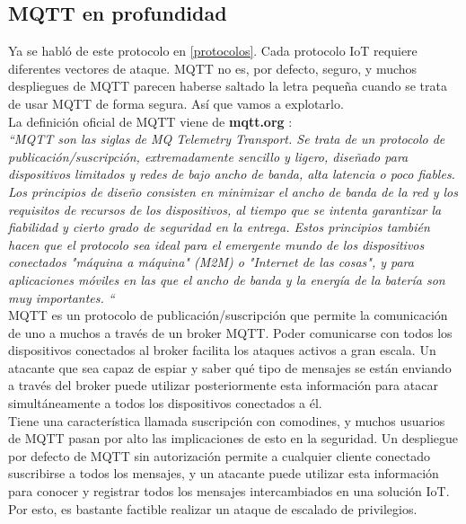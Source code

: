 {\subsection{MQTT en profundidad}

Ya se habló de este protocolo en \ref{protocolos}. Cada protocolo IoT requiere diferentes vectores de ataque. MQTT no es, por defecto, seguro, y muchos despliegues de MQTT parecen haberse saltado la letra pequeña cuando se trata de usar MQTT de forma segura. Así que vamos a explotarlo. \\

La definición oficial de MQTT viene de \textbf{mqtt.org} \cite{mqtt}: \\

\textit{``MQTT son las siglas de MQ Telemetry Transport. Se trata de un protocolo de publicación/suscripción, extremadamente sencillo y ligero, diseñado para dispositivos limitados y redes de bajo ancho de banda, alta latencia o poco fiables. Los principios de diseño consisten en minimizar el ancho de banda de la red y los requisitos de recursos de los dispositivos, al tiempo que se intenta garantizar la fiabilidad y cierto grado de seguridad en la entrega. Estos principios también hacen que el protocolo sea ideal para el emergente mundo de los dispositivos conectados "máquina a máquina" (M2M) o "Internet de las cosas", y para aplicaciones móviles en las que el ancho de banda y la energía de la batería son muy importantes. ``} \\


MQTT es un protocolo de publicación/suscripción que permite la comunicación de uno a muchos a través de un broker MQTT. Poder comunicarse con todos los dispositivos conectados al broker facilita los ataques activos a gran escala. Un atacante que sea capaz de espiar y saber qué tipo de mensajes se están enviando a través del broker puede utilizar posteriormente esta información para atacar simultáneamente a todos los dispositivos conectados a él. \\

Tiene una característica llamada suscripción con comodines, y muchos usuarios de MQTT pasan por alto las implicaciones de esto en la seguridad. Un despliegue por defecto de MQTT sin autorización permite a cualquier cliente conectado suscribirse a todos los mensajes, y un atacante puede utilizar esta información para conocer y registrar todos los mensajes intercambiados en una solución IoT. Por esto, es bastante factible realizar un ataque de escalado de privilegios. \cite{mqtt-security-1} \\


}
